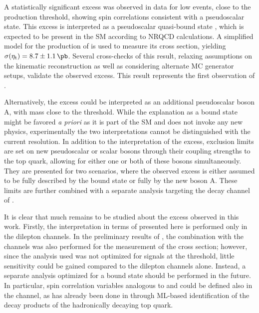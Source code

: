 A statistically significant excess was observed in data for low \mtt events, close to the \ttbar production threshold, showing spin correlations consistent with a pseudoscalar state. This excess is interpreted as a pseudoscalar \ttbar quasi-bound state \etat, which is expected to be present in the SM according to NRQCD calculations. A simplified model for the production of \etat is used to measure its cross section, yielding $\sigetat = 8.7 \pm 1.1\,\si{\pb}$. Several cross-checks of this result, relaxing assumptions on the \ttbar kinematic reconstruction as well as considering alternate MC generator setups, validate the observed excess. This result represents the first observation of \etat.

Alternatively, the excess could be interpreted as an additional pseudoscalar boson A, with mass close to the \ttbar threshold. While the explanation as a \ttbar bound state might be favored \textit{a priori} as it is part of the SM and does not invoke any new physics, experimentally the two interpretations cannot be distinguished with the current resolution.
In addition to the interpretation of the excess, exclusion limits are set on new pseudoscalar or scalar bosons \AH through their coupling strengths to the top quark, allowing for either one or both of these bosons simultaneously. They are presented for two scenarios, where the observed excess is either assumed to be fully described by the bound state \etat or fully by the new boson A. These limits are further combined with a separate analysis targeting the \ljets decay channel of \ttbar.




It is clear that much remains to be studied about the excess observed in this work. Firstly, the interpretation in terms of \etat presented here is performed only in the dilepton channels. In the preliminary results of , the combination with the \ljets channels was also performed for the measurement of the \etat cross section; however, since the \ljets analysis used was not optimized for signals at the \ttbar threshold, little sensitivity could be gained compared to the dilepton channels alone. Instead, a separate \ljets analysis optimized for a \ttbar bound state should be performed in the future. In particular, spin correlation variables analogous to \chel and \chan could be defined also in the \ljets channel, as has already been done in  through ML-based identification of the decay products of the hadronically decaying top quark.

